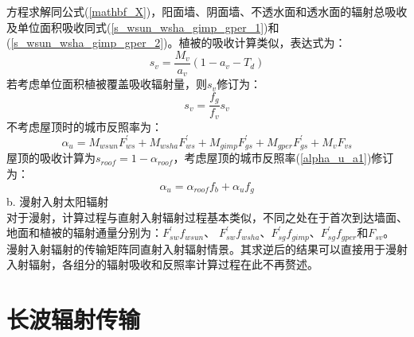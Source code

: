 方程求解同公式(\ref{mathbf_X})，阳面墙、阴面墙、不透水面和透水面的辐射总吸收及单位面积吸收同式(\ref{s_wsun_wsha_gimp_gper_1})和(\ref{s_wsun_wsha_gimp_gper_2})。植被的吸收计算类似，表达式为：
\begin{equation}
s_{v}=\frac{M_{v}}{a_{v}}\left(1-a_{v}-T_{d}\right)
\end{equation}
若考虑单位面积植被覆盖吸收辐射量，则$s_v$修订为：
\begin{equation}
s_{v}=\frac{f_{g}}{f_{v}} s_{v}
\end{equation}
不考虑屋顶时的城市反照率为：
\begin{equation}\label{alpha_u_a1}
\alpha_{u}=M_{wsun} F_{ws}^{\prime}+M_{wsha} F_{ws}^{\prime}+M_{gimp} F_{gs}^{\prime}+M_{gper} F_{gs}^{\prime}+M_{v} F_{v s}
\end{equation}
屋顶的吸收计算为$s_{roof}=1-\alpha_{roof}$，考虑屋顶的城市反照率(\ref{alpha_u_a1})修订为：
\begin{equation}
\alpha_{u}=\alpha_{roof} f_{b}+\alpha_{u} f_{g}
\end{equation}
b. 漫射入射太阳辐射\\
对于漫射，计算过程与直射入射辐射过程基本类似，不同之处在于首次到达墙面、地面和植被的辐射通量分别为：$F_{sw}^\prime f_{wsun}$、
$F_{sw}^\prime f_{wsha}$、$F_{sg}^\prime f_{gimp}$、$F_{sg}^\prime f_{gper}$和$F_{sv}$。
漫射入射辐射的传输矩阵同直射入射辐射情景。其求逆后的结果可以直接用于漫射入射辐射，各组分的辐射吸收和反照率计算过程在此不再赘述。 
\section{长波辐射传输}

